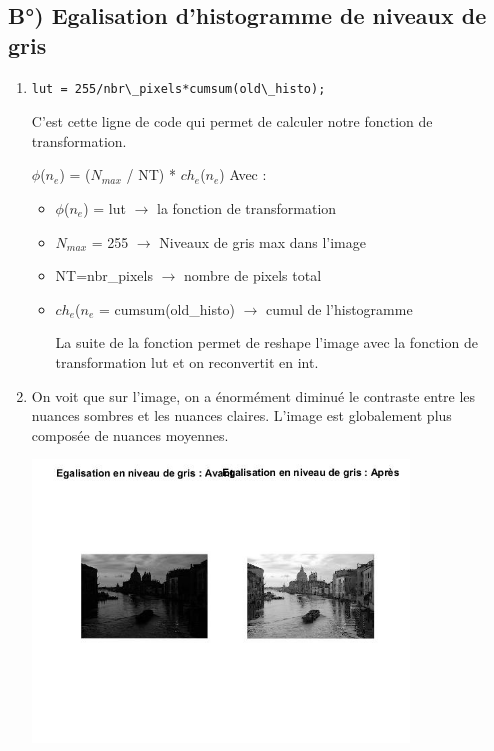 \documentclass{article}
\begin{document}
\subsection*{B°) Egalisation d’histogramme de niveaux de gris}
\begin{enumerate}[label=\arabic*$\degres$)]
\lstset{frame=none, numbers = none}
	\item
	\begin{lstlisting}
lut = 255/nbr\_pixels*cumsum(old\_histo);
\end{lstlisting}

C’est cette ligne de code qui permet de calculer notre fonction de transformation. 

$\phi$($n_{e}$) = ($N_{max}$ / NT) * $ch_{e}$($n_{e}$)
Avec : \begin{itemize}\renewcommand{\labelitemi}{$\bullet$}
		\item $\phi$($n_{e}$) = lut $\rightarrow$ la fonction de transformation
		\item $N_{max}$ = 255 $\rightarrow$ Niveaux de gris max dans l’image
		\item NT=nbr\_pixels $\rightarrow$ nombre de pixels total
		\item $ch_{e}$($n_{e}$ = cumsum(old\_histo) $\rightarrow$ cumul de l’histogramme

La suite de la fonction permet de reshape l’image avec la fonction de transformation lut et on reconvertit en int.
 	\end{itemize}
	\item On voit que sur l'image, on a énormément diminué le contraste entre les nuances sombres et les nuances claires. L'image est globalement plus composée de nuances moyennes.

\includegraphics[width=10cm]{Venise_egalisation.jpg}


\end{enumerate}
\end{document}
